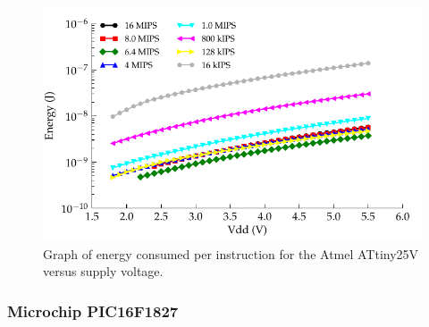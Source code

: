 \begin{figure}
  \centering
    \includegraphics{content/appendices/microprocessorPowerMeasurements/graphics/Graph_ATtiny25V_Clock_JPI}
  \caption{
  \label{fig:ATtiny25VClkJPI}Graph of energy consumed per instruction for the Atmel ATtiny25V versus supply voltage.}
\end{figure}


\subsubsection*{Microchip PIC16F1827}


